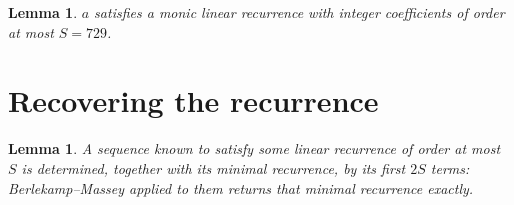 \documentclass[11pt,a4paper]{article}
\theoremstyle{plain}
\newtheorem{lemma}[theorem]{Lemma}
\theoremstyle{definition}
\begin{document}
\begin{lemma}\label{lem:cf}
$a$ satisfies a monic linear recurrence with integer coefficients of order at most $S=729$.
\end{lemma}

\section{Recovering the recurrence}

\begin{lemma}\label{lem:bm}
A sequence known to satisfy some linear recurrence of order at most $S$ is determined, together
with its minimal recurrence, by its first $2S$ terms: Berlekamp--Massey applied to them returns
that minimal recurrence exactly.
\end{lemma}
\end{document}
